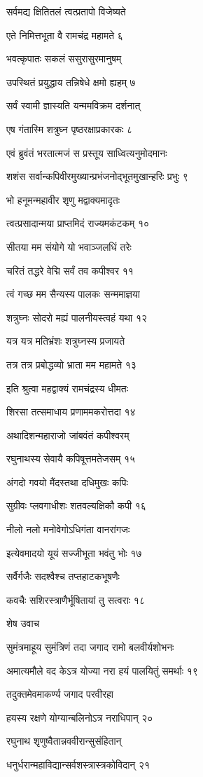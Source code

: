 सर्वमद्य क्षितितलं त्वत्प्रतापो विजेष्यते

एते निमित्तभूता वै रामचंद्र महामते ६

भवत्कृपातः सकलं ससुरासुरमानुषम्

उपस्थितं प्रयुद्धाय तन्निषेधे क्षमो ह्यहम् ७

सर्वं स्वामी ज्ञास्यति यन्ममविक्रम दर्शनात्

एष गंतास्मि शत्रुघ्न पृष्ठरक्षाप्रकारकः ८

एवं ब्रुवंतं भरतात्मजं स प्रस्तूय साध्वित्यनुमोदमानः

शशंस सर्वान्कपिवीरमुख्यान्प्रभंजनोद्भूतमुखान्हरिः प्रभुः ९

भो हनूमन्महावीर शृणु मद्वाक्यमादृतः

त्वत्प्रसादान्मया प्राप्तमिदं राज्यमकंटकम् १०

सीतया मम संयोगे यो भवाञ्जलधिं तरेः

चरितं तद्धरे वेद्मि सर्वं तव कपीश्वर ११

त्वं गच्छ मम सैन्यस्य पालकः सन्ममाज्ञया

शत्रुघ्नः सोदरो मह्यं पालनीयस्त्वहं यथा १२

यत्र यत्र मतिभ्रंशः शत्रुघ्नस्य प्रजायते

तत्र तत्र प्रबोद्धव्यो भ्राता मम महामते १३

इति श्रुत्वा महद्वाक्यं रामचंद्रस्य धीमतः

शिरसा तत्समाधाय प्रणाममकरोत्तदा १४

अथादिशन्महाराजो जांबवंतं कपीश्वरम्

रघुनाथस्य सेवायै कपिषूत्तमतेजसम् १५

अंगदो गवयो मैंदस्तथा दधिमुखः कपिः

सुग्रीवः प्लवगाधीशः शतवल्यक्षिकौ कपी १६

नीलो नलो मनोवेगोऽधिगंता वानरांगजः

इत्येवमादयो यूयं सज्जीभूता भवंतु भोः १७

सर्वैर्गजैः सदश्वैश्च तप्तहाटकभूषणैः

कवचैः सशिरस्त्राणैर्भूषितायां तु सत्वराः १८

शेष उवाच

सुमंत्रमाहूय सुमंत्रिणं तदा जगाद रामो बलवीर्यशोभनः

अमात्यमौले वद केऽत्र योज्या नरा हयं पालयितुं समर्थाः १९

तदुक्तमेवमाकर्ण्य जगाद परवीरहा

हयस्य रक्षणे योग्यान्बलिनोऽत्र नराधिपान् २०

रघुनाथ शृणुष्वैतान्नववीरान्सुसंहितान्

धनुर्धरान्महाविद्यान्सर्वशस्त्रास्त्रकोविदान् २१

